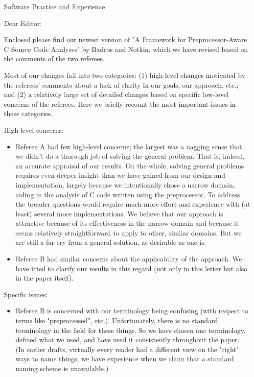\documentclass{letter}
\begin{document}
\begin{letter}{
Software Practice and Experience}

\opening{Dear Editor:}

Enclosed please find our newest version of "A Framework for
Preprocessor-Aware C Source Code Analyses" by Badros and Notkin, which we
have revised based on the comments of the two referees.

Most of our changes fall into two categories: (1) high-level changes
motivated by the referees' comments about a lack of clarity in our
goals, our approach, etc.; and (2) a relatively large set of detailed
changes based on specific low-level concerns of the referees.  Here we
briefly recount the most important issues in these categories.

High-level concerns:

\begin{itemize}

\item Referee A had few high-level concerns; the largest was a nagging
sense that we didn't do a thorough job of solving the general problem.  That
is, indeed, an accurate appraisal of our results.  On the whole, solving
general problems requires even deeper insight than we have gained from our
design and implementation, largely because we intentionally chose a narrow
domain, aiding in the analysis of C code written using the preprocessor.  To
address the broader questions would require much more effort and experience
with (at least) several more implementations.  We believe that our approach
is attractive because of its effectiveness in the narrow domain and because
it seems relatively straightforward to apply to other, similar domains.  But
we are still a far cry from a general solution, as desirable as one is.

\item Referee B had similar concerns about the applicability of the
approach.  We have tried to clarify our results in this regard (not only in
this letter but also in the paper itself).

\end{itemize}

Specific issues:

\begin{itemize}

\item Referee B is concerned with our terminology being confusing (with
respect to terms like "preprocessed", etc.).  Unfortunately, there is no
standard terminology in the field for these things.  So we have chosen one
terminology, defined what we used, and have used it consistently throughout
the paper.  (In earlier drafts, virtually every reader had a different view
on the "right" ways to name things; we have experience when we claim
that a standard naming scheme is unavailable.)


\end{itemize}
\end{letter}
\end{document}
